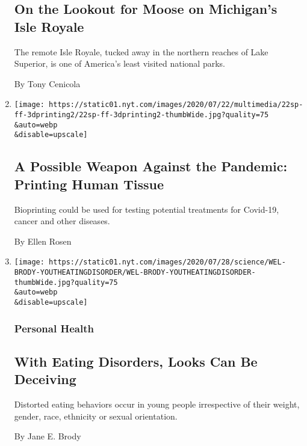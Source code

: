\begin{enumerate}
  \hypertarget{on-the-lookout-for-moose-on-michigans-isle-royale}{%
  \subsection{On the Lookout for Moose on Michigan's Isle
  Royale}\label{on-the-lookout-for-moose-on-michigans-isle-royale}}

  The remote Isle Royale, tucked away in the northern reaches of Lake
  Superior, is one of America's least visited national parks.

  By Tony Cenicola
\item
  \href{/2020/07/27/science/bioprinting-covid-19-tests.html}{}

  \texttt{[image: https://static01.nyt.com/images/2020/07/22/multimedia/22sp-ff-3dprinting2/22sp-ff-3dprinting2-thumbWide.jpg?quality=75\\\&auto=webp\\\&disable=upscale]}

  \hypertarget{a-possible-weapon-against-the-pandemic-printing-human-tissue}{%
  \subsection{A Possible Weapon Against the Pandemic: Printing Human
  Tissue}\label{a-possible-weapon-against-the-pandemic-printing-human-tissue}}

  Bioprinting could be used for testing potential treatments for
  Covid-19, cancer and other diseases.

  By Ellen Rosen
\item
  \href{/2020/07/27/well/eat/eating-disorders.html}{}

  \texttt{[image: https://static01.nyt.com/images/2020/07/28/science/WEL-BRODY-YOUTHEATINGDISORDER/WEL-BRODY-YOUTHEATINGDISORDER-thumbWide.jpg?quality=75\\\&auto=webp\\\&disable=upscale]}

  \hypertarget{personal-health}{%
  \subsubsection{Personal Health}\label{personal-health}}

  \hypertarget{with-eating-disorders-looks-can-be-deceiving-1}{%
  \subsection{With Eating Disorders, Looks Can Be
  Deceiving}\label{with-eating-disorders-looks-can-be-deceiving-1}}

  Distorted eating behaviors occur in young people irrespective of their
  weight, gender, race, ethnicity or sexual orientation.

  By Jane E. Brody
\end{enumerate}


